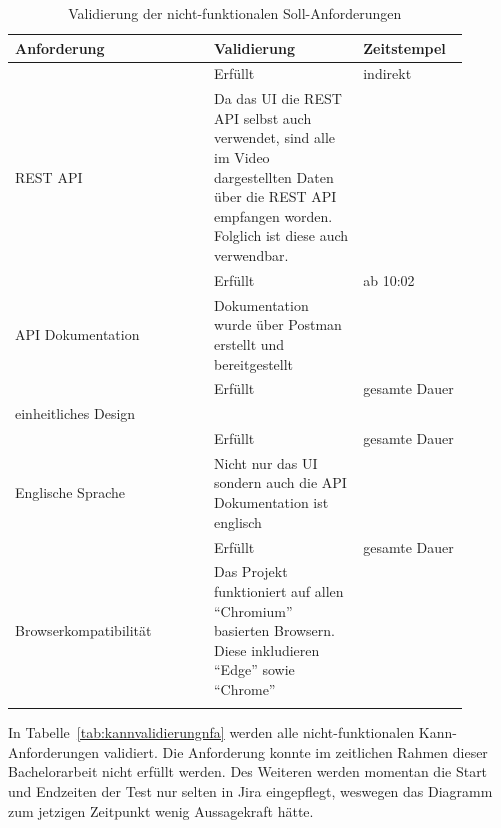 \begin{longtable}{| P{0.4\linewidth} | P{0.3\linewidth} | P{0.2\linewidth} |} 
  \hline
  \textbf{Anforderung} & \textbf{Validierung} & \textbf{Zeitstempel}\\ [0.5ex] 
  \hline
  
   & Erfüllt & indirekt \\
  REST API & Da das \gls{UI} die \gls{REST} \gls{API} selbst auch verwendet, sind alle im Video dargestellten Daten über die REST API empfangen worden. Folglich ist diese auch verwendbar. & \\ [0.5ex] \hline

   & Erfüllt & ab 10:02 \\
  API Dokumentation & Dokumentation wurde über Postman erstellt und bereitgestellt & \\ [0.5ex] \hline

   & Erfüllt & gesamte Dauer \\
  einheitliches Design &  & \\ [0.5ex] \hline

   & Erfüllt & gesamte Dauer \\
  Englische Sprache & Nicht nur das \gls{UI} sondern auch die API Dokumentation ist englisch & \\ [0.5ex] \hline

   & Erfüllt & gesamte Dauer \\
  Browserkompatibilität & Das Projekt funktioniert auf allen ``Chromium'' basierten Browsern. Diese inkludieren ``Edge'' sowie ``Chrome'' & \\ [0.5ex] \hline

  \caption{Validierung der nicht-funktionalen Soll-Anforderungen}\label{tab:sollvalidierungnfa}
\end{longtable}

In Tabelle~\ref{tab:kannvalidierungnfa} werden alle nicht-funktionalen Kann-Anforderungen 
validiert. Die Anforderung  konnte im zeitlichen Rahmen
dieser Bachelorarbeit nicht erfüllt werden. Des Weiteren werden momentan die Start und Endzeiten
der Test nur selten in \gls{Jira} eingepflegt, weswegen das Diagramm zum jetzigen Zeitpunkt wenig 
Aussagekraft hätte.

